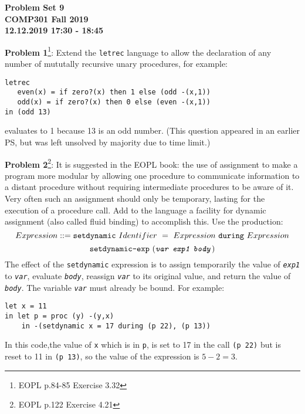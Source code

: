 \documentclass[12pt,reqno]{amsart}
\newcommand{\code}[1]{\texttt{#1}}
\begin{document}
\thispagestyle{empty}
\begin{center}
\large\textbf{Problem Set 9 \\ COMP301 Fall 2019} \\
\normalsize\textbf{12.12.2019 17:30 - 18:45} \\
\end{center}

\vspace{7.5mm}


\textbf{Problem 1}\footnote{EOPL p.84-85 Exercise 3.32}: Extend the \code{letrec} language to allow the declaration of any number of mututally recursive unary procedures, for example:
\begin{lstlisting}
letrec
   even(x) = if zero?(x) then 1 else (odd -(x,1))
   odd(x) = if zero?(x) then 0 else (even -(x,1))
in (odd 13)
\end{lstlisting}
evaluates to 1 because 13 is an odd number. (This question appeared in an earlier PS, but was left unsolved by majority due to time limit.)

\vspace{7.5mm}

\textbf{Problem 2}\footnote{EOPL p.122 Exercise 4.21}: It is suggested in the EOPL book: the use of assignment to make a program more modular by allowing one procedure to communicate information to a distant procedure without requiring intermediate procedures to be aware of it. Very often such an assignment should only be temporary, lasting for the execution of a procedure call. Add to the language a facility for dynamic assignment (also called fluid binding) to accomplish this. Use the production:
$$
Expression ::= \text{\code{setdynamic}}\text{ }Identifier\text{ } = \text{ }Expression \text{ }\text{\code{during}} \text{ }Expression
$$
$$
 \text{\code{setdynamic-exp}} \text{ }(\text{\textit{\code{var}}}\text{ } \text{\textit{\code{exp1}}}\text{ } \text{\textit{\code{body}}})
$$
The effect of the \code{setdynamic} expression is to assign temporarily the value of \textit{\code{exp1}} to \textit{\code{var}}, evaluate \textit{\code{body}}, reassign \textit{\code{var}} to its original value, and return the value of \textit{\code{body}}. The variable \textit{\code{var}} must already be bound. For example:
\begin{lstlisting}
let x = 11
in let p = proc (y) -(y,x)
    in -(setdynamic x = 17 during (p 22), (p 13))
\end{lstlisting}
In this code,the value of \code{x} which is in \code{p}, is set to 17 in the call \code{(p 22)} but is reset to 11 in \code{(p 13)}, so the value of the expression is $5-2 = 3$.
\end{document}
